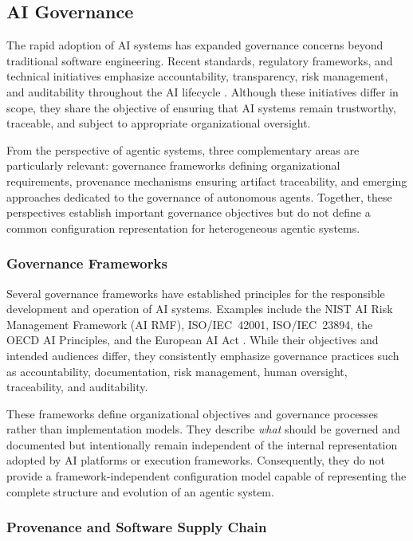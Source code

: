 \documentclass[10pt]{article}
\begin{document}
\subsection{AI Governance}
\label{sec:ai_governance}

The rapid adoption of AI systems has expanded governance concerns beyond traditional software engineering. Recent standards, regulatory frameworks, and technical initiatives emphasize accountability, transparency, risk management, and auditability throughout the AI lifecycle \cite{multiple_references2}. Although these initiatives differ in scope, they share the objective of ensuring that AI systems remain trustworthy, traceable, and subject to appropriate organizational oversight.

From the perspective of agentic systems, three complementary areas are particularly relevant: governance frameworks defining organizational requirements, provenance mechanisms ensuring artifact traceability, and emerging approaches dedicated to the governance of autonomous agents. Together, these perspectives establish important governance objectives but do not define a common configuration representation for heterogeneous agentic systems.

\subsubsection{Governance Frameworks}
\label{sec:governance_frameworks}

Several governance frameworks have established principles for the responsible development and operation of AI systems. Examples include the NIST AI Risk Management Framework (AI RMF), ISO/IEC~42001, ISO/IEC~23894, the OECD AI Principles, and the European AI Act \cite{multiple_references3}. While their objectives and intended audiences differ, they consistently emphasize governance practices such as accountability, documentation, risk management, human oversight, traceability, and auditability.

These frameworks define organizational objectives and governance processes rather than implementation models. They describe \emph{what} should be governed and documented but intentionally remain independent of the internal representation adopted by AI platforms or execution frameworks. Consequently, they do not provide a framework-independent configuration model capable of representing the complete structure and evolution of an agentic system.

\subsubsection{Provenance and Software Supply Chain}
\label{sec:provenance_supply_chain}
\end{document}
